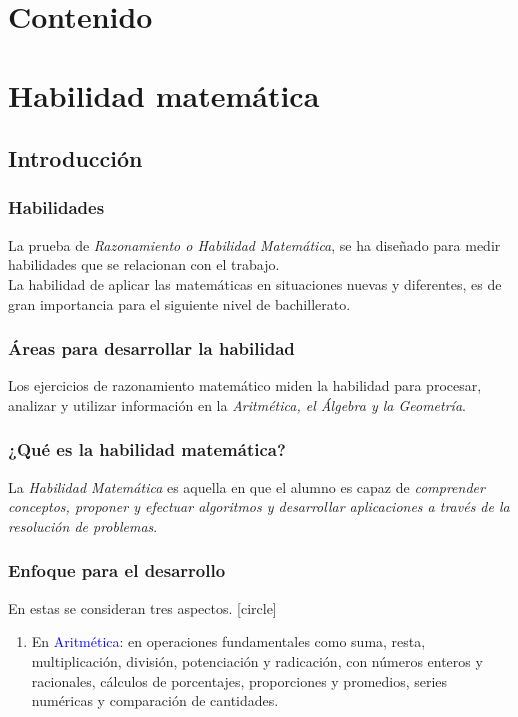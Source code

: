 \maketitle
\fontsize{14}{14}\selectfont
{}
\section*{Contenido}
\section{Habilidad matemática}

\subsection{Introducción}
\begin{frame}
\frametitle{Habilidades}
La prueba de \emph{Razonamiento o Habilidad Matemática}, se ha diseñado para medir habilidades que se relacionan con el trabajo.
\\
\bigskip
\pause
La habilidad de aplicar las matemáticas en situaciones nuevas y diferentes, es de gran importancia para el siguiente nivel de bachillerato.
\end{frame}
\begin{frame}
\frametitle{Áreas para desarrollar la habilidad}
Los ejercicios de razonamiento matemático miden la habilidad para procesar, analizar y utilizar información en la \emph{Aritmética, el Álgebra y la Geometría}.
\end{frame}
\begin{frame}
\frametitle{¿Qué es la habilidad matemática?}
La \emph{Habilidad Matemática} es aquella en que el alumno es capaz de \emph{comprender conceptos, proponer y efectuar algoritmos y desarrollar aplicaciones a través de la resolución de problemas}.
\end{frame}
\begin{frame}
\frametitle{Enfoque para el desarrollo}
En estas se consideran tres aspectos.
[circle]
\begin{enumerate}[<+->]
\item En \textcolor{blue}{Aritmética}: en operaciones fundamentales como suma, resta, multiplicación, división, potenciación y radicación, con números enteros y racionales, cálculos de porcentajes, proporciones y promedios, series numéricas y comparación de cantidades.
\seti
\end{enumerate}
\end{frame}
